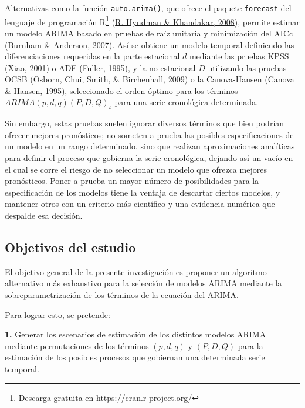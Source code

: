 \documentclass[
]{article}
\begin{document}
Alternativas como la función \texttt{auto.arima()}, que ofrece el
paquete \texttt{forecast} del lenguaje de programación R\footnote{Descarga
  gratuita en \url{https://cran.r-project.org/}}
(\protect\hyperlink{ref-auto.arima}{R. Hyndman \& Khandakar, 2008}),
permite estimar un modelo ARIMA basado en pruebas de raíz unitaria y
minimización del AICc (\protect\hyperlink{ref-burnham2007model}{Burnham
\& Anderson, 2007}). Así se obtiene un modelo temporal definiendo las
diferenciaciones requeridas en la parte estacional \(d\) mediante las
pruebas KPSS
(\protect\hyperlink{ref-doi:10.1111ux2f1467-9892.00213}{Xiao, 2001}) o
ADF (\protect\hyperlink{ref-fuller1995introduction}{Fuller, 1995}), y la
no estacional \(D\) utilizando las pruebas OCSB
(\protect\hyperlink{ref-Osborn2009SEASONALITYAT}{Osborn, Chui, Smith, \&
Birchenhall, 2009}) o la Canova-Hansen
(\protect\hyperlink{ref-10.2307ux2f1392184}{Canova \& Hansen, 1995}),
seleccionado el orden óptimo para los términos
\(ARIMA(p, d, q)(P, D, Q)_s\) para una serie cronológica determinada.

Sin embargo, estas pruebas suelen ignorar diversos términos que bien
podrían ofrecer mejores pronósticos; no someten a prueba las posibles
especificaciones de un modelo en un rango determinado, sino que realizan
aproximaciones analíticas para definir el proceso que gobierna la serie
cronológica, dejando así un vacío en el cual se corre el riesgo de no
seleccionar un modelo que ofrezca mejores pronósticos. Poner a prueba un
mayor número de posibilidades para la especificación de los modelos
tiene la ventaja de descartar ciertos modelos, y mantener otros con un
criterio más científico y una evidencia numérica que despalde esa
decisión.

\subsection{Objetivos del estudio}

El objetivo general de la presente investigación es proponer un
algoritmo alternativo más exhaustivo para la selección de modelos ARIMA
mediante la sobreparametrización de los términos de la ecuación del
ARIMA.

Para lograr esto, se pretende:

\textbf{1.} Generar los escenarios de estimación de los distintos
modelos ARIMA mediante permutaciones de los términos \((p,d,q)\) y
\((P,D,Q)\) para la estimación de los posibles procesos que gobiernan
una determinada serie temporal.
\end{document}
